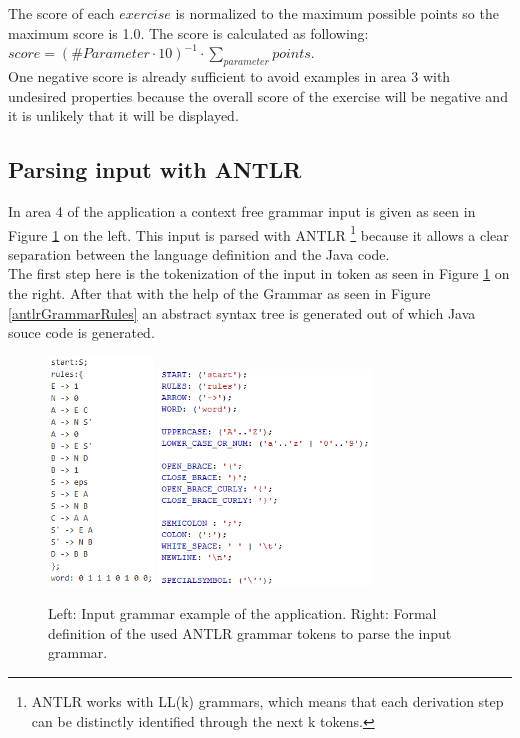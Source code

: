 \noindent The score of each $exercise$ is normalized to the maximum possible points so the maximum score is 1.0. The score is calculated as following:\\ $score = (\#Parameter\cdot10)^{-1}\cdot\sum\limits_{parameter}^{}points$. \\
One negative score is already sufficient to avoid examples in area 3 with undesired properties because the overall score of the exercise will be negative and it is unlikely that it will be displayed.
\pagebreak

\subsection{Parsing input with ANTLR}
In area 4 of the application a context free grammar input is given as seen in Figure \ref{antlrGrammarTokens} on the left. This input is parsed with ANTLR \footnote{ANTLR works with LL(k) grammars, which means that each derivation step can be distinctly identified through the next k tokens.} because it allows a clear separation between the language definition and the Java code.\\
The first step here is the tokenization of the input in token as seen in Figure \ref{antlrGrammarTokens} on the right. After that with the help of the Grammar as seen in Figure \ref{antlrGrammarRules} an abstract syntax tree is generated out of which Java souce code is generated.\\
\noindent
\begin{figure} [h]
	\centering
	\includegraphics[width=0.25\textwidth]{abb/exampleGrammarInput.png}
	\includegraphics[width=0.5\textwidth]{abb/antrlTokens.png}
	\caption{Left: Input grammar example of the application. Right: Formal definition of the used ANTLR grammar tokens to parse the input grammar.}
	\label{antlrGrammarTokens}
\end{figure}
